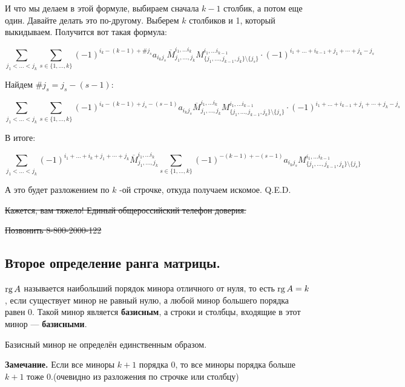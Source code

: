 \begin{itemize}
          И что мы делаем в этой формуле, выбираем сначала $k-1$ столбик, а потом еще один. Давайте делать это по-другому. Выберем $k$ столбиков и 1, который выкидываем. Получится вот такая формула:


          \small\[\sum\limits_{j_1<\ldots<j_k} \sum\limits_{s \in \{1,\ldots,k\}} (-1)^{i_k -(k-1) +\# j_s} a_{i_kj_s}\overline{M}_{j_1,\ldots,j_{k}}^{i_1,\ldots i_k} M_{\{j_1,\ldots,j_{k-1}, j_k\}\setminus\{j_s\} }^{i_1,\ldots i_{k-1}} \cdot (-1)^{i_1+ \ldots+i_{k-1} + j_1 + \cdots + j_{k}-j_{s}}\]\normalsize

          Найдем $\#j_s = j_s-(s-1)$:

          \small\[\sum\limits_{j_1<\ldots<j_k} \sum\limits_{s \in \{1,\ldots,k\}} (-1)^{i_k -(k-1) +j_s-(s-1)} a_{i_kj_s}\overline{M}_{j_1,\ldots,j_{k}}^{i_1,\ldots i_k} M_{\{j_1,\ldots,j_{k-1}, j_k\}\setminus\{j_s\}}^{i_1,\ldots i_{k-1}} \cdot (-1)^{i_1+ \ldots+i_{k-1} + j_1 + \cdots + j_{k}-j_{s}}\]\normalsize

          В итоге:

          \small\[\sum\limits_{j_1<\ldots<j_k} (-1)^{i_1+ \ldots+i_{k} + j_1 + \cdots + j_{k}}\overline{M}_{j_1,\ldots,j_{k}}^{i_1,\ldots i_k}\sum\limits_{s \in \{1,\ldots,k\}} (-1)^{ -(k-1) +-(s-1)} a_{i_kj_s} M_{\{j_1,\ldots,j_{k-1}, j_k\}\setminus\{j_s\}}^{i_1,\ldots i_{k-1}}\]\normalsize

          А это будет разложением по $k$ -ой строчке, откуда получаем искомое. Q.E.D.


          \sout{Кажется, вам тяжело! Единый общероссийский телефон доверия:}

          \sout{Позвонить 8-800-2000-122}
\end{itemize}



\subsection{Второе определение ранга матрицы.}



\(\operatorname{rg} A\) называется наибольший порядок минора отличного от нуля, то есть \(\operatorname{rg} A = k\), если существует минор не равный нулю, а любой минор большего порядка равен 0. Такой минор является \textbf{базисным}, а строки и столбцы, входящие в этот минор --- \textbf{базисными}.

Базисный минор не определён единственным образом.

\textbf{Замечание.}  Если все миноры \(k+1\) порядка 0, то все миноры порядка больше \(k+1\) тоже 0.(очевидно из разложения по строчке или столбцу)


